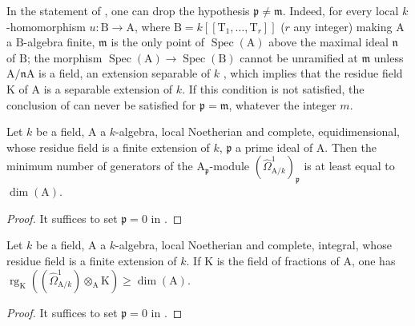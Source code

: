 \begin{remark}[18.11.6]
\label{IV.18.11.6}
In the statement of , one can drop the hypothesis $\mathfrak{p}\neq\mathfrak{m}$.
Indeed, for every local $k$-homomorphism $u:\mathrm{B}\to\mathrm{A}$, where $\mathrm{B}=k[[\mathrm{T}_1,\ldots,\mathrm{T}_r]]$ ($r$ any integer) making $\mathrm{A}$ a $\mathrm{B}$-algebra finite, $\mathfrak{m}$ is the only point of $\operatorname{Spec}(\mathrm{A})$ above the maximal ideal $\mathfrak{n}$ of $\mathrm{B}$; the morphism $\operatorname{Spec}(\mathrm{A})\to\operatorname{Spec}(\mathrm{B})$ cannot be unramified at $\mathfrak{m}$ unless $\mathrm{A}/\mathfrak{n}\mathrm{A}$ is a field, an extension separable of $k$ , which implies that the residue field $\mathrm{K}$ of $\mathrm{A}$ is a separable extension of $k$.
If this condition is not satisfied, the conclusion of  can never be satisfied for $\mathfrak{p}=\mathfrak{m}$, whatever the integer $m$.
\end{remark}

\begin{corollary}[18.11.7]
\label{IV.18.11.7}
Let $k$ be a field, $\mathrm{A}$ a $k$-algebra, local Noetherian and complete, equidimensional, whose residue field is a finite extension of $k$, $\mathfrak{p}$ a prime ideal of $\mathrm{A}$.
Then the minimum number of generators of the $\mathrm{A}_\mathfrak{p}$-module $(\hat{\Omega}^1_{\mathrm{A}/k})_\mathfrak{p}$ is at least equal to $\dim(\mathrm{A})$.
\end{corollary}

\begin{proof}
It suffices to set $\mathfrak{p}=0$ in .
\end{proof}

\begin{corollary}[18.11.8]
\label{IV.18.11.8}
Let $k$ be a field, $\mathrm{A}$ a $k$-algebra, local Noetherian and complete, integral, whose residue field is a finite extension of $k$.
If $\mathrm{K}$ is the field of fractions of $\mathrm{A}$, one has $\operatorname{rg}_{\mathrm{K}}((\hat{\Omega}^1_{\mathrm{A}/k})\otimes_{\mathrm{A}}\mathrm{K})\geq\dim(\mathrm{A})$.
\end{corollary}

\begin{proof}
It suffices to set $\mathfrak{p}=0$ in .
\end{proof}

